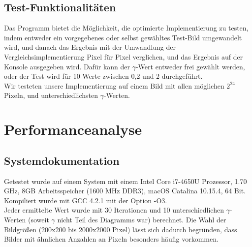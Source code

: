 \documentclass[course=erap]{aspdoc}
\begin{document}
	\subsection{Test-Funktionalitäten}
	Das Programm bietet die Möglichkeit, die optimierte Implementierung zu testen, indem entweder ein vorgegebenes oder selbst gewähltes Test-Bild umgewandelt wird, und danach das Ergebnis mit der Umwandlung der Vergleichsimplementierung Pixel für Pixel verglichen, und das Ergebnis auf der Konsole ausgegeben wird. Dafür kann der $\gamma$-Wert entweder frei gewählt werden, oder der Test wird für 10 Werte zwischen 0,2 und 2 durchgeführt.\\
	Wir testeten unsere Implementierung auf einem Bild mit allen möglichen $2^{24}$ Pixeln, und unterschiedlichsten $\gamma$-Werten.
	
	\section{Performanceanalyse}
	\subsection{Systemdokumentation}
	Getestet wurde auf einem System mit einem Intel Core i7-4650U Prozessor, 1.70 GHz, 8GB Arbeitsspeicher (1600 MHz DDR3), macOS Catalina 10.15.4, 64 Bit.
    Kompiliert wurde mit GCC 4.2.1 mit der Option -O3.\\
    Jeder ermittelte Wert wurde mit 30 Iterationen und 10 unterschiedlichen $\gamma$-Werten (soweit $\gamma$ nicht Teil des Diagramms war) berechnet. Die Wahl der Bildgrößen (200x200 bis 2000x2000 Pixel) lässt sich dadurch begründen, dass Bilder mit ähnlichen Anzahlen an Pixeln besonders häufig vorkommen.
\end{document}
